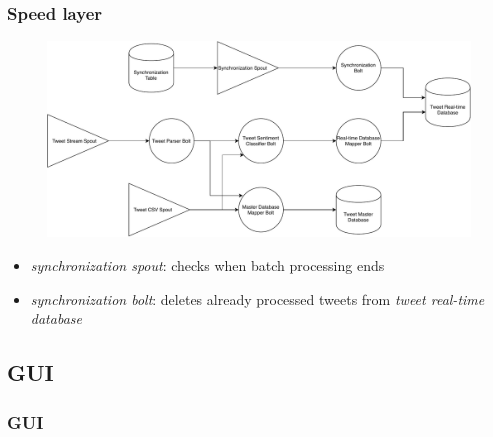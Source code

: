 \documentclass[xcolor=table, unknownkeysallowed]{beamer}
\begin{document}

\begin{frame}
\frametitle{Speed layer}
\vspace{-0.5cm}
\begin{figure}
\includegraphics[width=0.95\linewidth]{img/storm_topology_diagram}
\label{fig:storm_topology_diagram}
\end{figure}
\begin{itemize}
\item \emph{synchronization spout}: checks when batch processing ends
\vspace{0.15cm}
\item \emph{synchronization bolt}: deletes already processed tweets from \emph{tweet real-time database}
\end{itemize}
\end{frame}


\subsection{GUI}

\begin{frame}
\frametitle{GUI}
\begin{center}
  \end{center}
\end{frame}
\end{document}
